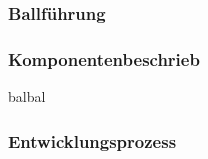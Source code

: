 \subsubsection{Ballführung}
\subsubsection*{Komponentenbeschrieb}

balbal

\subsubsection*{Entwicklungsprozess}